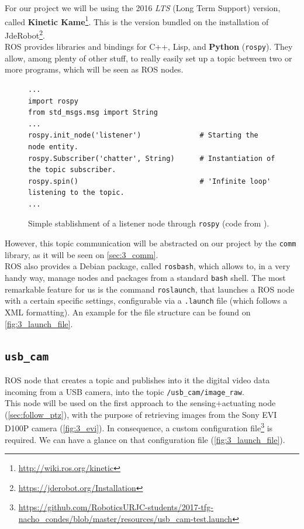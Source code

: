 	For our project we will be using the 2016 \textit{LTS} (Long Term Support) version, called \textbf{Kinetic Kame}\footnote{\url{http://wiki.ros.org/kinetic}}. This is the version bundled on the installation of JdeRobot\footnote{\url{https://jderobot.org/Installation}}.\\
	
	ROS provides libraries and bindings for C++, Lisp, and \textbf{Python} (\texttt{rospy}). They allow, among plenty of other stuff, to really easily set up a topic between two or more programs, which will be seen as ROS nodes.\\
	\begin{figure}[h]
		\begin{lstlisting}
...
import rospy
from std_msgs.msg import String
...
rospy.init_node('listener')              # Starting the node entity.
rospy.Subscriber('chatter', String)      # Instantiation of the topic subscriber.
rospy.spin()                             # 'Infinite loop' listening to the topic.
...
		\end{lstlisting}
		\caption{Simple stablishment of a listener node through \texttt{rospy} (code from \cite{listener-rospy}).}
		\label{fig:3_rospy_listener}
	\end{figure}
	
	However, this topic communication will be abstracted on our project by the \texttt{comm} library, as it will be seen on \autoref{sec:3_comm}.\\
	
	ROS also provides a Debian package, called \texttt{rosbash}, which allows to, in a very handy way, manage nodes and packages from a standard \texttt{bash} shell. The most remarkable feature for us is the command \texttt{roslaunch}, that launches a ROS node with a certain specific settings, configurable via a \texttt{.launch} file (which follows a XML formatting). An example for the file structure can be found on \autoref{fig:3_launch_file}.\\
	
	\subsection{\texttt{usb\_cam}}
	\label{sec:3_usb_cam}
		ROS node that creates a topic and publishes into it the digital video data incoming from a USB camera, into the topic \texttt{/usb\_cam/image\_raw}.\\
		
		This node will be used on the first approach to the sensing+actuating node (\autoref{sec:follow_ptz}), with the purpose of retrieving images from the Sony EVI D100P camera (\autoref{fig:3_evi}). In consequence, a custom configuration file\footnote{\url{https://github.com/RoboticsURJC-students/2017-tfg-nacho\_condes/blob/master/resources/usb\_cam-test.launch}} is required. We can have a glance on that configuration file (\autoref{fig:3_launch_file}).\\
		
